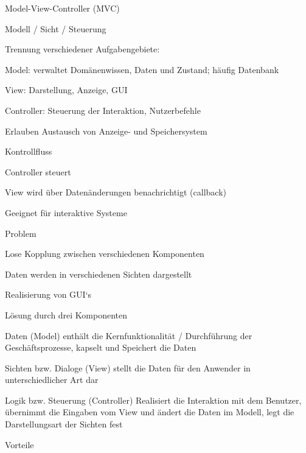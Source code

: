 \documentclass[a4paper]{article}
\begin{document}
\begin{multicols}{3}
  Model-View-Controller (MVC)
  \begin{itemize*}
    \item Modell / Sicht / Steuerung
    \item Trennung verschiedener Aufgabengebiete:
          \begin{itemize*}
            \item Model: verwaltet Domänenwissen, Daten und Zustand; häufig Datenbank
            \item View: Darstellung, Anzeige, GUI
            \item Controller: Steuerung der Interaktion, Nutzerbefehle
          \end{itemize*}
    \item Erlauben Austausch von Anzeige- und Speichersystem
    \item Kontrollfluss
          \begin{itemize*}
            \item Controller steuert
            \item View wird über Datenänderungen benachrichtigt (callback)
          \end{itemize*}
    \item Geeignet für interaktive Systeme
    \item Problem
          \begin{itemize*}
            \item Lose Kopplung zwischen verschiedenen Komponenten
            \item Daten werden in verschiedenen Sichten dargestellt
            \item Realisierung von GUI‘s
          \end{itemize*}
    \item Lösung durch drei Komponenten
          \begin{itemize*}
            \item Daten (Model) enthält die Kernfunktionalität / Durchführung der Geschäftsprozesse, kapselt und Speichert die Daten
            \item Sichten bzw. Dialoge (View) stellt die Daten für den Anwender in unterschiedlicher Art dar
            \item Logik bzw. Steuerung (Controller) Realisiert die Interaktion mit dem Benutzer, übernimmt die Eingaben vom View und ändert die Daten im Modell, legt die Darstellungsart der Sichten fest
          \end{itemize*}
    \item Vorteile

\end{itemize*}
\end{multicols}
\end{document}
